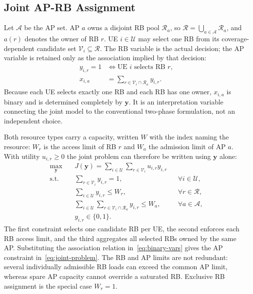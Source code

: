 \documentclass[journal]{IEEEtran}
\newcommand{\calV}{\mathcal{V}}  %
\newcommand{\calU}{\mathcal{U}}  %
\newcommand{\calA}{\mathcal{A}}  %
\newcommand{\calR}{\mathcal{R}}  %
\begin{document}
\subsection{Joint AP-RB Assignment}
\label{sec:general-form}

Let $\calA$ be the AP set. AP $a$ owns a disjoint RB pool $\calR_a$, so $\calR=\bigcup_{a\in\calA}\calR_a$, and $a(r)$ denotes the owner of RB $r$. UE $i\in\calU$ may select one RB from its coverage-dependent candidate set $\calV_i\subseteq\calR$. The RB variable is the actual decision; the AP variable is retained only as the association implied by that decision:
\begin{equation}
\label{eq:binary-vars}
\begin{aligned}
y_{i,r}=1
&\iff \text{UE $i$ selects RB $r$},\\
x_{i,a}
&=\sum_{r\in\calV_i\cap\calR_a}y_{i,r}.
\end{aligned}
\end{equation}
Because each UE selects exactly one RB and each RB has one owner, $x_{i,a}$ is binary and is determined completely by $\bm y$. It is an interpretation variable connecting the joint model to the conventional two-phase formulation, not an independent choice.

Both resource types carry a capacity, written $W$ with the index naming the resource: $W_r$ is the access limit of RB $r$ and $W_a$ the admission limit of AP $a$. With utility $u_{i,r}\ge0$ the joint problem can therefore be written using $\bm y$ alone:
\begin{equation}
\label{eq:joint-problem}
\begin{aligned}
\max_{\bm y}\quad
&J(\bm y)=\sum_{i\in\calU}\sum_{r\in\calV_i}u_{i,r}y_{i,r}\\
\mathrm{s.t.}\quad
&\sum_{r\in\calV_i}y_{i,r}=1,
&&\forall i\in\calU,\\
&\sum_{i\in\calU}y_{i,r}\le W_r,
&&\forall r\in\calR,\\
&\sum_{i\in\calU}\sum_{r\in\calV_i\cap\calR_a}y_{i,r}\le W_a,
&&\forall a\in\calA,\\
&y_{i,r}\in\{0,1\}.
\end{aligned}
\end{equation}
The first constraint selects one candidate RB per UE, the second enforces each RB access limit, and the third aggregates all selected RBs owned by the same AP. Substituting the association relation in~\eqref{eq:binary-vars} gives the AP constraint in~\eqref{eq:joint-problem}. The RB and AP limits are not redundant: several individually admissible RB loads can exceed the common AP limit, whereas spare AP capacity cannot override a saturated RB. Exclusive RB assignment is the special case $W_r=1$.
\end{document}
